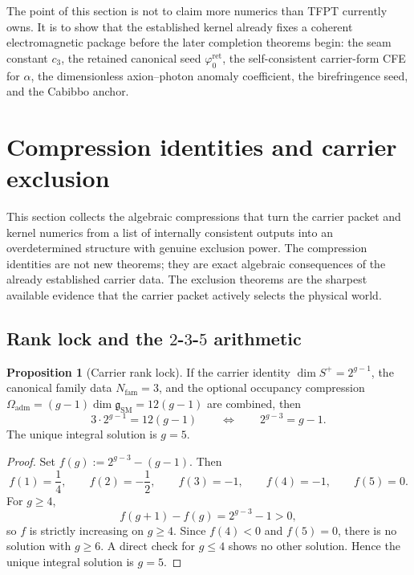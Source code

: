 \documentclass[11pt,a4paper]{article}
\theoremstyle{definition}
\newtheorem{proposition}[theorem]{Proposition}
\theoremstyle{remark}
\newcommand{\cthree}{c_3}
\newcommand{\phiz}{\varphi_0^{\mathrm{ret}}}
\newcommand{\SM}{\mathrm{SM}}
\newcommand{\Oadm}{\Omega_{\mathrm{adm}}}
\begin{document}
\begin{tcolorbox}[colback=tfptblue!3, colframe=tfptblue, breakable,
    title={Kernel-output package}, colbacktitle=tfptblue]
The point of this section is not to claim more numerics than TFPT currently owns. It is to show that the established kernel already fixes a coherent electromagnetic package before the later completion theorems begin: the seam constant $\cthree$, the retained canonical seed $\phiz$, the self-consistent carrier-form CFE for $\alpha$, the dimensionless axion--photon anomaly coefficient, the birefringence seed, and the Cabibbo anchor.
\end{tcolorbox}

\section{Compression identities and carrier exclusion}

This section collects the algebraic compressions that turn the carrier packet and kernel numerics from a list of internally consistent outputs into an overdetermined structure with genuine exclusion power. The compression identities are not new theorems; they are exact algebraic consequences of the already established carrier data. The exclusion theorems are the sharpest available evidence that the carrier packet actively selects the physical world.

\subsection{Rank lock and the \texorpdfstring{$2$-$3$-$5$}{2-3-5} arithmetic}

\begin{proposition}[Carrier rank lock]
\label{prop:rank-lock}
If the carrier identity $\dim S^+=2^{g-1}$, the canonical family data $N_{\mathrm{fam}}=3$, and the optional occupancy compression $\Oadm=(g-1)\dim\mathfrak g_{\SM}=12(g-1)$ are combined, then
\begin{equation}
\label{eq:rank-lock}
3\cdot 2^{g-1}=12(g-1)
\qquad\Longleftrightarrow\qquad
2^{g-3}=g-1.
\end{equation}
The unique integral solution is $g=5$.
\end{proposition}

\begin{proof}
Set $f(g):=2^{g-3}-(g-1)$. Then
\[
f(1)=\frac14,\qquad
f(2)=-\frac12,\qquad
f(3)=-1,\qquad
f(4)=-1,\qquad
f(5)=0.
\]
For $g\ge 4$,
\[
f(g+1)-f(g)=2^{g-3}-1>0,
\]
so $f$ is strictly increasing on $g\ge 4$. Since $f(4)<0$ and $f(5)=0$, there is no solution with $g\ge 6$. A direct check for $g\le 4$ shows no other solution. Hence the unique integral solution is $g=5$.
\end{proof}
\end{document}
